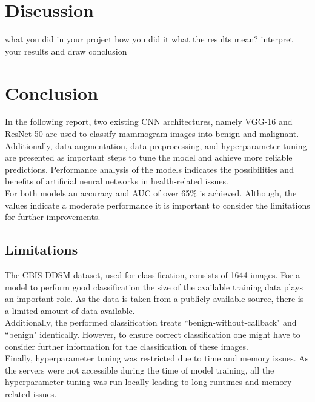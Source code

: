 \documentclass[sn-mathphys,Numbered]{sn-jnl}%
\theoremstyle{thmstyleone}%
\theoremstyle{thmstyletwo}%
\theoremstyle{thmstylethree}%
\begin{document}
\section{Discussion}\label{Discussion}
what you did in your project
how you did it
what the results mean?
interpret your results and draw conclusion

\section{Conclusion}\label{conclusion}
In the following report, two existing CNN architectures, namely VGG-16 and ResNet-50 are used to classify mammogram images into benign and malignant.\\
Additionally, data augmentation, data preprocessing, and hyperparameter tuning are presented as important steps to tune the model and achieve more reliable predictions.
Performance analysis of the models indicates the possibilities and benefits of artificial neural networks in health-related issues. \\
For both models an accuracy and AUC of over 65\% is achieved.
Although, the values indicate a moderate performance it is important to consider the limitations for further improvements. 
\subsection{Limitations}\label{limitation}
The CBIS-DDSM dataset, used for classification, consists of 1644 images. For a model to perform good classification the size of the available training data plays an important role. As the data is taken from a publicly available source, there is a limited amount of data available. \\
Additionally, the performed classification treats ``benign-without-callback"  and ``benign" identically. However, to ensure correct classification one might have to consider further information for the classification of these images.\\
Finally, hyperparameter tuning was restricted due to time and memory issues. As the servers were not accessible during the time of model training, all the hyperparameter tuning was run locally leading to long runtimes and memory-related issues. 




\end{document}
